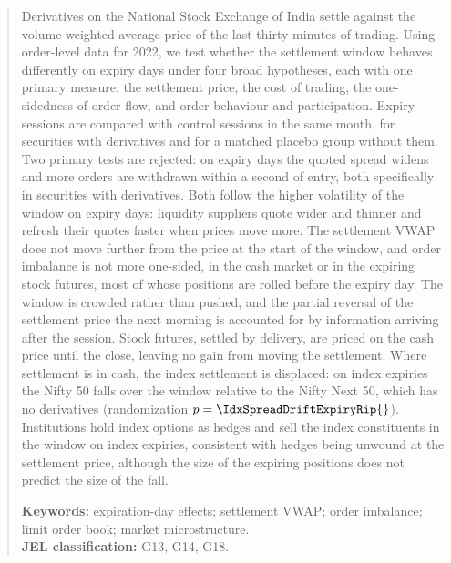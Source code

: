 \begin{abstract}
\noindent Derivatives on the National Stock Exchange of India settle against the volume-weighted
average price of the last thirty minutes of trading. Using order-level data for 2022, we test
whether the settlement window behaves differently on expiry days under four broad hypotheses,
each with one primary measure: the settlement price, the cost of trading, the one-sidedness of
order flow, and order behaviour and participation. Expiry sessions are compared with control
sessions in the same month, for securities with derivatives and for a matched placebo group
without them. Two primary tests are rejected: on expiry days the quoted spread widens and more
orders are withdrawn within a second of entry, both specifically in securities with
derivatives. Both follow the higher volatility of the window on expiry days: liquidity
suppliers quote wider and thinner and refresh their quotes faster when prices move more. The
settlement VWAP does not move further from the price at the start of the window, and order
imbalance is not more one-sided, in the cash market or in the expiring stock futures, most of
whose positions are rolled before the expiry day. The window is crowded rather than pushed, and
the partial reversal of the settlement price the next morning is accounted for by information
arriving after the session.
Stock futures, settled by delivery, are priced on the cash price until the close, leaving no
gain from moving the settlement. Where settlement is in cash, the index settlement is displaced:
on index expiries the Nifty 50 falls over the window relative to the Nifty Next 50, which has no
derivatives (randomization $p = \IdxSpreadDriftExpiryRip{}$). Institutions hold index options
as hedges and sell the index constituents in the window on index expiries, consistent with
hedges being unwound at the settlement price, although the size of the expiring positions does
not predict the size of the fall.

\vspace{0.6em}
\noindent \textbf{Keywords:} expiration-day effects; settlement VWAP; order imbalance; limit order
book; market microstructure. \\
\noindent \textbf{JEL classification:} G13, G14, G18.
\end{abstract}
